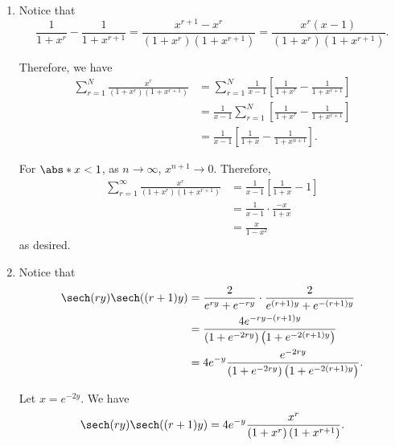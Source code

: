 \Question{\currfilebase}

\begin{enumerate}
    \item Notice that
          \[
              \frac{1}{1 + x^r} - \frac{1}{1 + x^{r + 1}} = \frac{x^{r + 1} - x^r}{(1 + x^r)(1 + x^{r + 1})} = \frac{x^r (x - 1)}{(1 + x^r)(1 + x^{r + 1})}.
          \]

          Therefore, we have
          \begin{align*}
              \sum_{r = 1}^{N} \frac{x^r}{(1 + x^r)(1 + x^{r + 1})} & = \sum_{r = 1}^{N} \frac{1}{x - 1} \left[\frac{1}{1 + x^r} - \frac{1}{1 + x^{r + 1}}\right] \\
                                                                    & = \frac{1}{x - 1} \sum_{r = 1}^{N}\left[\frac{1}{1 + x^r} - \frac{1}{1 + x^{r + 1}}\right]  \\
                                                                    & = \frac{1}{x - 1} \left[\frac{1}{1 + x} - \frac{1}{1 + x^{n + 1}}\right].
          \end{align*}

          For \(\abs*{x} < 1\), as \(n \to \infty\), \(x^{n + 1} \to 0\). Therefore,
          \begin{align*}
              \sum_{r = 1}^{\infty} \frac{x^r}{(1 + x^r)(1 + x^{r + 1})} & = \frac{1}{x - 1} \left[\frac{1}{1 + x} - 1\right] \\
                                                                         & = \frac{1}{x - 1} \cdot \frac{-x}{1 + x}           \\
                                                                         & = \frac{x}{1 - x^2}
          \end{align*}
          as desired.

    \item Notice that
          \begin{align*}
              \sech (ry) \sech((r + 1)y) & = \frac{2}{e^{ry} + e^{-ry}} \cdot \frac{2}{e^{(r + 1)y} + e^{-(r + 1)y}}             \\
                                         & = \frac{4e^{-ry - (r + 1)y}}{\left(1 + e^{-2ry}\right) \left(1 + e^{-2(r+1)y}\right)} \\
                                         & = 4 e^{-y} \frac{e^{-2ry}}{\left(1 + e^{-2ry}\right) \left(1 + e^{-2(r+1)y}\right)}.
          \end{align*}

          Let \(x = e^{-2y}\). We have
          \[
              \sech (ry) \sech((r + 1)y) = 4e^{-y} \frac{x^r}{\left(1 + x^r\right)\left(1 + x^{r + 1}\right)}.
          \]


\end{enumerate}
